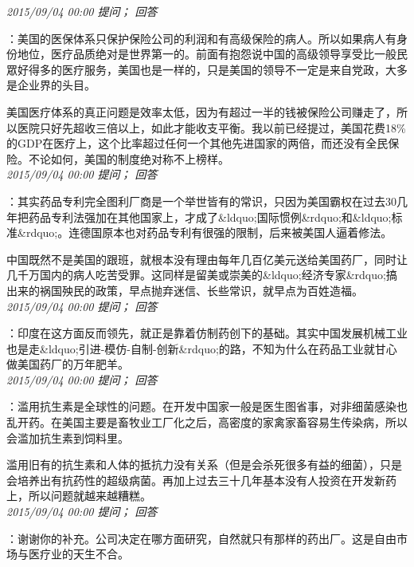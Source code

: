 \documentclass[twocolumn]{ctexart}
\begin{document}
\textit{\hfill\noindent\small 2015/09/04 00:00 提问； 回答}

：美国的医保体系只保护保险公司的利润和有高级保险的病人。所以如果病人有身份地位，医疗品质绝对是世界第一的。前面有抱怨说中国的高级领导享受比一般民眾好得多的医疗服务，美国也是一样的，只是美国的领导不一定是来自党政，大多是企业界的头目。

美国医疗体系的真正问题是效率太低，因为有超过一半的钱被保险公司赚走了，所以医院只好先超收三倍以上，如此才能收支平衡。我以前已经提过，美国花费18\%的GDP在医疗上，这个比率超过任何一个其他先进国家的两倍，而还没有全民保险。不论如何，美国的制度绝对称不上榜样。\\

\textit{\hfill\noindent\small 2015/09/04 00:00 提问； 回答}

：其实药品专利完全图利厂商是一个举世皆有的常识，只因为美国霸权在过去30几年把药品专利法强加在其他国家上，才成了\&ldquo;国际惯例\&rdquo;和\&ldquo;标准\&rdquo;。连德国原本也对药品专利有很强的限制，后来被美国人逼着修法。

中国既然不是美国的跟班，就根本没有理由每年几百亿美元送给美国药厂，同时让几千万国内的病人吃苦受罪。这同样是留美或崇美的\&ldquo;经济专家\&rdquo;搞出来的祸国殃民的政策，早点抛弃迷信、长些常识，就早点为百姓造福。\\

\textit{\hfill\noindent\small 2015/09/04 00:00 提问； 回答}

：印度在这方面反而领先，就正是靠着仿制药创下的基础。其实中国发展机械工业也是走\&ldquo;引进-模仿-自制-创新\&rdquo;的路，不知为什么在药品工业就甘心做美国药厂的万年肥羊。\\

\textit{\hfill\noindent\small 2015/09/04 00:00 提问； 回答}

：滥用抗生素是全球性的问题。在开发中国家一般是医生图省事，对非细菌感染也乱开药。在美国主要是畜牧业工厂化之后，高密度的家禽家畜容易生传染病，所以会滥加抗生素到饲料里。

滥用旧有的抗生素和人体的抵抗力没有关系（但是会杀死很多有益的细菌），只是会培养出有抗药性的超级病菌。再加上过去三十几年基本没有人投资在开发新药上，所以问题就越来越糟糕。\\

\textit{\hfill\noindent\small 2015/09/04 00:00 提问； 回答}

：谢谢你的补充。公司决定在哪方面研究，自然就只有那样的药出厂。这是自由市场与医疗业的天生不合。
\end{document}
